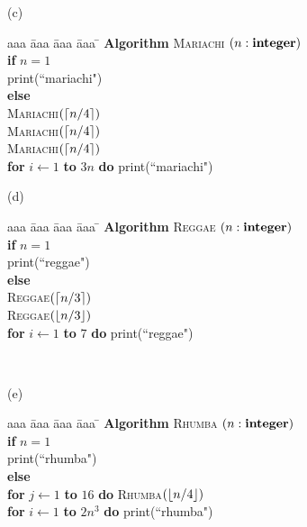 \documentclass{article}
\begin{document}
\begin{problem}
\bigskip
\noindent
(c)\ \ 
\begin{minipage}[t]{3in}
\begin{tabbing}
aaa \= aaa \= aaa \= aaa \=  \kill
\textbf{Algorithm} \textsc{Mariachi} $(n: \mbox{\bf integer})$ \\
          \> \textbf{if} $n = 1$ \\
          \>\>  print(``mariachi") \\
          \>\textbf{else} \\
          \>\>  \textsc{Mariachi}$({\left\lceil n/4\right\rceil})$\\
          \>\>  \textsc{Mariachi}$({\left\lceil n/4\right\rceil})$\\
          \>\>  \textsc{Mariachi}$({\left\lceil n/4\right\rceil})$\\
      \>\> \textbf{for} $i \leftarrow 1$ \textbf{to} $3n$ \textbf{do} print(``mariachi")
\end{tabbing}
\end{minipage}

\bigskip
\noindent
(d)\ \ 
\begin{minipage}[t]{3in}
\begin{tabbing}
aaa \= aaa \= aaa \= aaa \=  \kill
\textbf{Algorithm} \textsc{Reggae} $(n: \mbox{\bf integer})$ \\
          \> \textbf{if} $n = 1$ \\
          \>\>  print(``reggae") \\
          \>\textbf{else} \\
          \>\>  \textsc{Reggae}$({\left\lceil n/3\right\rceil})$\\
          \>\>  \textsc{Reggae}$({\left\lfloor n/3\right\rfloor})$\\
      \>\> \textbf{for} $i \leftarrow 1$ \textbf{to} $7$ \textbf{do} print(``reggae")
\end{tabbing}
\end{minipage}
\bigskip
\ 


\bigskip
\noindent
(e)\ \ 
\begin{minipage}[t]{3in}
\begin{tabbing}
aaa \= aaa \= aaa \= aaa \=  \kill
\textbf{Algorithm} \textsc{Rhumba} $(n: \mbox{\bf integer})$ \\
          \> \textbf{if} $n = 1$ \\
          \>\>  print(``rhumba") \\
          \>\textbf{else} \\
          \>\>  \textbf{for} $j \leftarrow 1$ \textbf{to} $16$ 
					\textbf{do} \textsc{Rhumba}$({\left\lfloor n/4\right\rfloor})$\\
      \>\> \textbf{for} $i \leftarrow 1$ \textbf{to} $2n^3$ \textbf{do} print(``rhumba")
\end{tabbing}
\end{minipage}
\bigskip
\


\end{problem}
\end{document}
